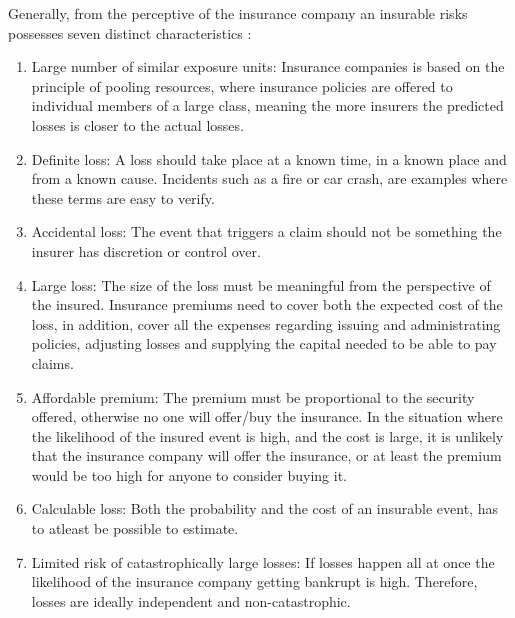 Generally, from the perceptive of the insurance company an insurable risks possesses seven distinct characteristics \cite{mehr1980principles}: 
   \begin{enumerate}
   \item Large number of similar exposure units: Insurance companies is based on the principle of
    pooling resources, where insurance policies are offered to individual members of a large class,
     meaning the more insurers the predicted losses is closer to the actual losses. 
   \item Definite loss: A loss should take place at a known time, in a known place and from a known
    cause. Incidents such as a fire or car crash, are examples where these terms are easy to verify.
   \item Accidental loss: The event that triggers a claim should not be 
   something the insurer has discretion or control over.
   \item Large loss: The size of the loss must be meaningful from the perspective of the insured.
    Insurance premiums need to cover both the expected cost of the loss, in addition, 
    cover all the expenses regarding issuing and administrating policies, adjusting losses and
     supplying the capital needed to be able to pay claims.
   \item Affordable premium: The premium must be proportional to the security offered, otherwise no
    one will offer/buy the insurance. In the situation where the likelihood of the insured event is
     high, and the cost is large, it is unlikely that the insurance company will offer the insurance,
      or at least the premium would be too high for anyone to consider buying it. 
   \item Calculable loss: Both the probability and the cost of an insurable event,
    has to atleast be possible to estimate. 
   \item Limited risk of catastrophically large losses: If losses happen all at once the likelihood of
    the insurance company getting bankrupt is high. Therefore, losses are ideally independent and non-catastrophic. 
   \end{enumerate}
 
